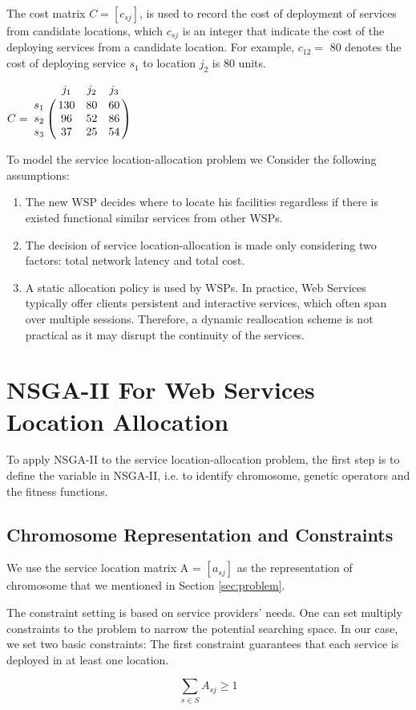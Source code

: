\documentclass{llncs}
\let\bbordermatrix\bordermatrix
\begin{document}
The cost matrix $C = [c_{sj}]$, is used to record the cost of deployment of services from candidate locations, 
which $c_{sj}$ is an integer that indicate the cost of the deploying services from a candidate location. 
For example, $c_{12} = $ 80 denotes the cost of deploying service $s_{1}$ to location $j_{2}$ is 80 units.
\begin{center}
$
C = \bbordermatrix{~ & j_{1} & j_{2} & j_{3}\cr
					s_{1}	&130 &80 &60\cr
					s_{2}	&96  &52 &86\cr
					s_{3}	&37 &25 &54\cr} 
$
\end{center}

To model the service location-allocation problem we Consider the following assumptions:
\begin{enumerate}
	\item The new WSP decides where to locate his facilities regardless if there is existed functional similar services from other WSPs.
	\item The decision of service location-allocation is made only considering two factors: total network latency and total cost.
	\item A static allocation policy is used by WSPs. In practice, Web Services typically offer clients persistent and interactive services, which often span over multiple sessions. Therefore, a dynamic reallocation scheme is not practical as it may disrupt the continuity of the services.
\end{enumerate}





\section{NSGA-II For Web Services Location Allocation}
\label{sec:algorithm_des}
To apply NSGA-II to the service location-allocation problem, the first step is to define the variable in NSGA-II, i.e. to
identify chromosome, genetic operators and the fitness functions.

\subsection{Chromosome Representation and Constraints}
We use the service location matrix A = $[a_{sj}]$ as the representation of chromosome that we mentioned in Section 
\ref{sec:problem}.

The constraint setting is based on service providers' needs. One can set multiply constraints to the problem to narrow the potential searching space.
In our case, we set two basic constraints: The first constraint guarantees that each service is deployed in at 
least one location.
\begin{center}
	\begin{equation}
		\sum\limits_{s \in S} A_{sj} \geq 1
	\end{equation}
\end{center}
\end{document}
